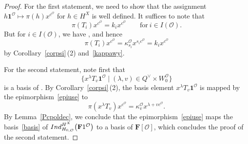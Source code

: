 \documentclass[10pt,a4paper]{amsart}
\begin{document}
\begin{proof}
For the first statement, we need to show that the assignment $h\mathbf{1}^{\mathcal{O}}\mapsto\pi(h)x^{c^\mathcal{O}}$ for $h\in H^X$ is well defined. It suffices to note that
\[
\pi(T_i)x^{c^\mathcal{O}}=k_ix^{c^\mathcal{O}}\qquad \text{for}\ i\in I(\mathcal{O}).
\]
But for $i\in I(\mathcal{O})$, we have , and hence
\[
\pi(T_i)x^{c^\mathcal{O}}=\kappa_{s_i}^\mathcal{O} x^{s_ic^\mathcal{O}}=k_ix^{c^\mathcal{O}}
\]
by Corollary~\ref{corpsi}\,(2) and~\eqref{kappawy}.

For the second statement, note first that
\begin{equation}\label{basis}
\bigl\{x^\lambda T_v\mathbf{1}^{\mathcal{O}}\mid (\lambda,v)\in Q^\vee\times W_0^\mathcal{O}\bigr\}
\end{equation}
is a basis of . By Corollary~\ref{corpsi}\,(2), the basis element $x^\lambda T_v\mathbf{1}^{\mathcal{O}}$
is mapped by the epimorphism~\eqref{epiuse} to
\[
\pi(x^\lambda T_v)x^{c^\mathcal{O}}=\kappa_v^\mathcal{O}x^{\lambda+vc^\mathcal{O}}.
\]
By Lemma~\ref{Pcpoldec}, we conclude that the epimorphism~\eqref{epiuse} maps the basis~\eqref{basis} of
${\rm Ind}_{H_{0,\mathcal{O}}}^{H^X}\bigl(\mathbf{F}1^\mathcal{O}\bigr)$
to a basis of $\mathbf{F}[\mathcal{O}]$, which concludes the proof of the second statement.
\end{proof}
\end{document}
